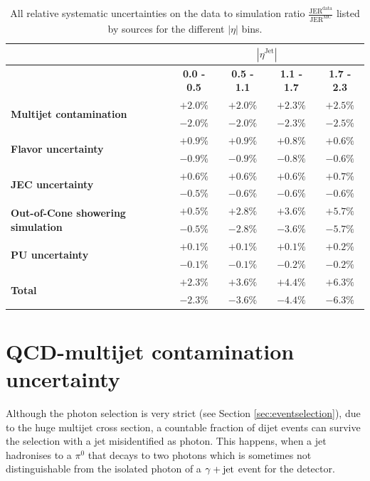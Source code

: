 \begin{table}[t]
\caption{All relative systematic uncertainties on the data to simulation ratio $\frac{\text{JER}^{\text{data}}}{\text{JER}^{\text{MC}}}$ listed by sources for the different $|\eta|$ bins.}
\renewcommand{\arraystretch}{1.2}
\begin{center}
\begin{tabular}{ l| c | c | c | c |}
\multicolumn{1}{c}{} & \multicolumn{4}{c}{$|\eta^{\text{Jet}}|$}\\\hline
& \textbf{0.0 - 0.5}& \textbf{0.5 - 1.1}& \textbf{1.1 - 1.7}& \textbf{1.7 - 2.3}\\\hline
\multirow{2}{*}{\textbf{Multijet contamination}}& $+2.0 \% $ & $+2.0 \% $ & $+2.3 \% $ & $+2.5 \% $ \\
& $-2.0 \% $ & $-2.0 \% $ & $-2.3 \% $ & $-2.5 \% $ \\\hline
\multirow{2}{*}{\textbf{Flavor uncertainty}}& $+0.9 \% $ & $+0.9 \% $ & $+0.8 \% $ & $+0.6 \% $ \\
& $-0.9 \% $ & $-0.9 \% $ & $-0.8 \% $ & $-0.6 \% $ \\\hline
\multirow{2}{*}{\textbf{JEC uncertainty}}& $+0.6 \% $ & $+0.6 \% $ & $+0.6 \% $ & $+0.7 \% $ \\
& $-0.5 \% $ & $-0.6 \% $ & $-0.6 \% $ & $-0.6 \% $ \\\hline
\multirow{2}{*}{\textbf{Out-of-Cone showering simulation}}& $+0.5 \% $ & $+2.8 \% $ & $+3.6 \% $ & $+5.7 \% $ \\
& $-0.5 \% $ & $-2.8 \% $ & $-3.6 \% $ & $-5.7 \% $ \\\hline
\multirow{2}{*}{\textbf{PU uncertainty}}& $+0.1 \% $ & $+0.1 \% $ & $+0.1 \% $ & $+0.2 \% $ \\
& $-0.1 \% $ & $-0.1 \% $ & $-0.2 \% $ & $-0.2 \% $ \\\hline\hline
\multirow{2}{*}{\textbf{Total}}& $+2.3 \% $ & $+3.6 \% $ & $+4.4 \% $ & $+6.3 \% $ \\
& $-2.3 \% $ & $-3.6 \% $ & $-4.4 \% $ & $-6.3 \% $ \\\hline
\end{tabular}
\end{center}
\label{tab:Uncertainties}
\end{table}

\section*{QCD-multijet contamination uncertainty}
Although the photon selection is very strict (see Section \ref{sec:eventselection}), 
due to the huge multijet cross section, a countable fraction of dijet events can survive the selection with a jet misidentified as photon.
This happens, when \eg a jet hadronises to a $\pi^0$ that decays to two photons which is sometimes not distinguishable from the isolated photon of a $\gamma + \text{jet}$ event for the detector.

